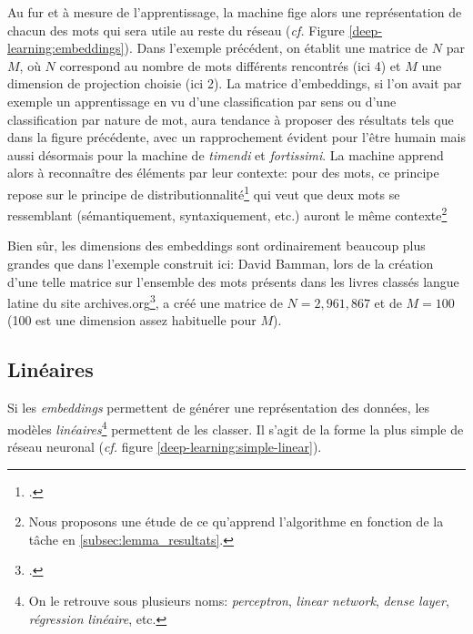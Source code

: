 Au fur et à mesure de l'apprentissage, la machine fige alors une représentation de chacun des mots qui sera utile au reste du réseau (\textit{cf.} Figure \ref{deep-learning:embeddings}). Dans l'exemple précédent, on établit une matrice de $N$ par $M$, où $N$ correspond au nombre de mots différents rencontrés (ici 4) et $M$ une dimension de projection choisie (ici 2). La matrice d'embeddings, si l'on avait par exemple un apprentissage en vu d'une classification par sens ou d'une classification par nature de mot, aura tendance à proposer des résultats tels que dans la figure précédente, avec un rapprochement évident pour l'être humain mais aussi désormais pour la machine de \textit{timendi} et \textit{fortissimi}. La machine apprend alors à reconnaître des éléments par leur contexte: pour des mots, ce principe repose sur le principe de distributionnalité\footcite{firth_papers_1957} qui veut que deux mots se ressemblant (sémantiquement, syntaxiquement, etc.) auront le même contexte\footnote{Nous proposons une étude de ce qu'apprend l'algorithme en fonction de la tâche en \ref{subsec:lemma_resultats}.}





Bien sûr, les dimensions des embeddings sont ordinairement beaucoup plus grandes que dans l'exemple construit ici: David Bamman, lors de la création d'une telle matrice sur l'ensemble des mots présents dans les livres classés langue latine du site archives.org\footcite{bamman_11k_2012}, a créé une matrice de $N=2,961,867$ et de $M=100$ (100 est une dimension assez habituelle pour $M$). 

\subsection{Linéaires}

Si les \textit{embeddings} permettent de générer une représentation des données, les modèles \textit{linéaires}\footnote{On le retrouve sous plusieurs noms: \textit{perceptron}, \textit{linear network}, \textit{dense layer}, \textit{régression linéaire}, etc.} permettent de les classer. Il s'agit de la forme la plus simple de réseau neuronal (\textit{cf.} figure \ref{deep-learning:simple-linear}). 

